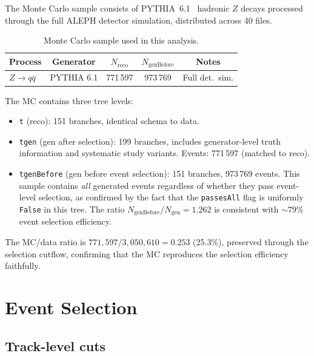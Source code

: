 \documentclass[11pt,a4paper]{article}
\begin{document}
The Monte Carlo sample consists of PYTHIA~6.1~\cite{Sjostrand:2000wi}
hadronic $Z$ decays processed through the full ALEPH detector
simulation, distributed across 40 files.

\begin{table}[htbp]
\centering
\caption{Monte Carlo sample used in this analysis.}
\label{tbl:mc}
\begin{tabular}{lcccc}
\toprule
Process & Generator & $N_\text{reco}$ & $N_\text{genBefore}$
  & Notes \\
\midrule
$Z \to q\bar{q}$ & PYTHIA 6.1 & 771\,597 & 973\,769
  & Full det.\ sim. \\
\bottomrule
\end{tabular}
\end{table}

The MC contains three tree levels:
\begin{itemize}
\item \texttt{t} (reco): 151 branches, identical schema to data.
\item \texttt{tgen} (gen after selection): 199 branches, includes
  generator-level truth information and systematic study variants.
  Events: 771\,597 (matched to reco).
\item \texttt{tgenBefore} (gen before event selection): 151 branches,
  973\,769 events.  This sample contains \emph{all} generated events
  regardless of whether they pass event-level selection, as confirmed by
  the fact that the \texttt{passesAll} flag is uniformly \texttt{False}
  in this tree.  The ratio $N_\text{genBefore}/N_\text{gen} = 1.262$
  is consistent with $\sim\!79\%$ event selection efficiency.
\end{itemize}

The MC/data ratio is $771{,}597 / 3{,}050{,}610 = 0.253$ (25.3\%),
preserved through the selection cutflow, confirming that the MC
reproduces the selection efficiency faithfully.

\section{Event Selection}
\label{sec:selection}

\subsection{Track-level cuts}
\label{sec:track-cuts}
\end{document}
